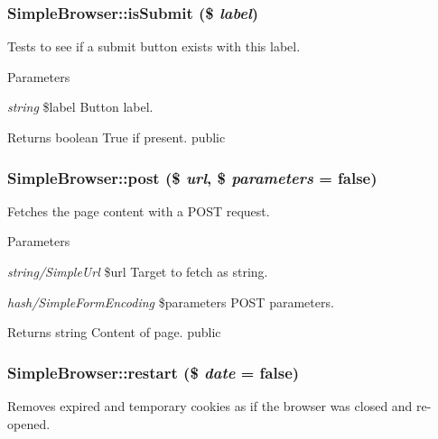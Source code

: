 \hypertarget{class_simple_browser_ab4e7dee19771dcfb1a2ad260bbc0dbdf}{
\subsubsection[{isSubmit}]{\setlength{\rightskip}{0pt plus 5cm}SimpleBrowser::isSubmit (\$ {\em label})}}
\label{class_simple_browser_ab4e7dee19771dcfb1a2ad260bbc0dbdf}
Tests to see if a submit button exists with this label. 
\begin{DoxyParams}{Parameters}
\item[{\em string}]\$label Button label. \end{DoxyParams}
\begin{DoxyReturn}{Returns}
boolean True if present.  public 
\end{DoxyReturn}
\hypertarget{class_simple_browser_a3886cc42827b3365e3e9f418f3d17323}{
\subsubsection[{post}]{\setlength{\rightskip}{0pt plus 5cm}SimpleBrowser::post (\$ {\em url}, \/  \$ {\em parameters} = {\ttfamily false})}}
\label{class_simple_browser_a3886cc42827b3365e3e9f418f3d17323}
Fetches the page content with a POST request. 
\begin{DoxyParams}{Parameters}
\item[{\em string/SimpleUrl}]\$url Target to fetch as string. \item[{\em hash/SimpleFormEncoding}]\$parameters POST parameters. \end{DoxyParams}
\begin{DoxyReturn}{Returns}
string Content of page.  public 
\end{DoxyReturn}
\hypertarget{class_simple_browser_af390891e306e3ddcd2ac5ebc3df5a287}{
\subsubsection[{restart}]{\setlength{\rightskip}{0pt plus 5cm}SimpleBrowser::restart (\$ {\em date} = {\ttfamily false})}}
\label{class_simple_browser_af390891e306e3ddcd2ac5ebc3df5a287}
Removes expired and temporary cookies as if the browser was closed and re-\/opened. 
